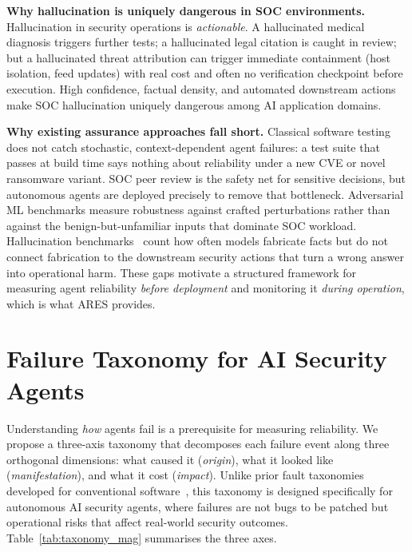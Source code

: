 \documentclass[journal,compsoc]{IEEEtran}
\newcommand{\ARES}{\textsc{ARES}}
\begin{document}
\textbf{Why hallucination is uniquely dangerous in SOC environments.}
Hallucination in security operations is \textit{actionable}. A hallucinated
medical diagnosis triggers further tests; a hallucinated legal citation is
caught in review; but a hallucinated threat attribution can trigger immediate
containment (host isolation, feed updates) with real cost and often no
verification checkpoint before execution. High confidence, factual density,
and automated downstream actions make SOC hallucination uniquely dangerous
among AI application domains.

\textbf{Why existing assurance approaches fall short.}
Classical software testing does not catch stochastic, context-dependent
agent failures: a test suite that passes at build time says nothing about
reliability under a new CVE or novel ransomware variant. SOC peer review
is the safety net for sensitive decisions, but autonomous agents are
deployed precisely to remove that bottleneck. Adversarial ML benchmarks
measure robustness against crafted perturbations rather than against the
benign-but-unfamiliar inputs that dominate SOC workload. Hallucination
benchmarks~\cite{bang2025hallulens} count how often models fabricate
facts but do not connect fabrication to the downstream security actions
that turn a wrong answer into operational harm. These gaps motivate a
structured framework for measuring agent reliability \textit{before
deployment} and monitoring it \textit{during operation}, which is what
\ARES{} provides.

\section{Failure Taxonomy for AI Security Agents}

Understanding \textit{how} agents fail is a prerequisite for measuring
reliability. We propose a three-axis taxonomy that decomposes each
failure event along three orthogonal dimensions: what caused it
(\textit{origin}), what it looked like (\textit{manifestation}), and
what it cost (\textit{impact}). Unlike prior fault taxonomies developed
for conventional software~\cite{avizienis2004}, this taxonomy is
designed specifically for autonomous AI security agents, where
failures are not bugs to be patched but operational risks that affect
real-world security outcomes. Table~\ref{tab:taxonomy_mag} summarises
the three axes.
\end{document}
